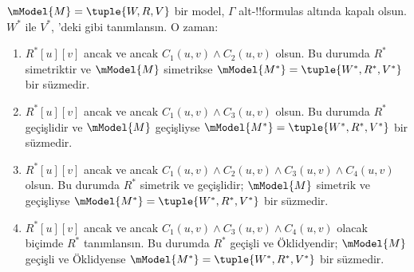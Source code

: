 \documentclass[../../../include/open-logic-section]{subfiles}
\begin{document}
\begin{thm}
  $\mModel{M}=\tuple{W,R,V}$ bir model, $\Gamma$ alt-!!{formula}s altında
  kapalı olsun. $W^*$ ile $V^*$, 'deki gibi
  tanımlansın. O zaman:
  \begin{enumerate}
  \item $R^*[u][v]$ ancak ve ancak $C_1(u,v)\land C_2(u,v)$ olsun.
    Bu durumda $R^*$ simetriktir ve $\mModel{M}$ simetrikse
    $\mModel{M^*}=\tuple{W^*,R^*,V^*}$ bir süzmedir.
  \item $R^*[u][v]$ ancak ve ancak $C_1(u,v)\land C_3(u,v)$ olsun.
    Bu durumda $R^*$ geçişlidir ve $\mModel{M}$ geçişliyse
    $\mModel{M^*}=\tuple{W^*,R^*,V^*}$ bir süzmedir.
  \item $R^*[u][v]$ ancak ve ancak $C_1(u,v)\land C_2(u,v)
    \land C_3(u,v)\land C_4(u,v)$ olsun. Bu durumda $R^*$ simetrik ve
    geçişlidir; $\mModel{M}$ simetrik ve geçişliyse
    $\mModel{M^*}=\tuple{W^*,R^*,V^*}$ bir süzmedir.
  \item $R^*[u][v]$ ancak ve ancak $C_1(u,v)\land C_3(u,v)
    \land C_4(u,v)$ olacak biçimde $R^*$ tanımlansın. Bu durumda $R^*$
    geçişli ve Öklidyendir; $\mModel{M}$ geçişli ve Öklidyense
    $\mModel{M^*}=\tuple{W^*,R^*,V^*}$ bir süzmedir.
  \end{enumerate}
\end{thm}
\end{document}
